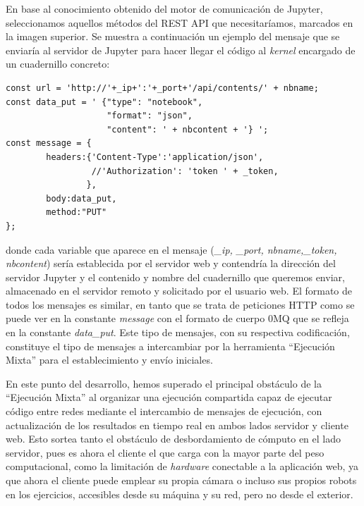 En base al conocimiento obtenido del motor de comunicación de Jupyter, seleccionamos aquellos métodos del REST API que necesitaríamos, marcados en la imagen superior. Se muestra a continuación un ejemplo del mensaje que se enviaría al servidor de Jupyter para hacer llegar el código al \textit{kernel} encargado de un cuadernillo concreto:

\begin{minipage}{\linewidth}
\begin{lstlisting}[caption=Formato de Mensajes de ``Ejecución Mixta'']
const url = 'http://'+_ip+':'+_port+'/api/contents/' + nbname;
const data_put = ' {"type": "notebook",
                    "format": "json",
                    "content": ' + nbcontent + '} ';
const message = {
        headers:{'Content-Type':'application/json',
                 //'Authorization': 'token ' + _token,
                },
        body:data_put,
        method:"PUT"
};
\end{lstlisting}
\end{minipage}

donde cada variable que aparece en el mensaje (\textit{\_ip, \_port, nbname,\_token, nbcontent}) sería establecida por el servidor web y contendría la dirección del servidor Jupyter y el contenido y nombre del cuadernillo que queremos enviar, almacenado en el servidor remoto y solicitado por el usuario web. El formato de todos los mensajes es similar, en tanto que se trata de peticiones HTTP como se puede ver en la constante \textit{message} con el formato de cuerpo 0MQ que se refleja en la constante \textit{data\_put}. Este tipo de mensajes, con su respectiva codificación, constituye el tipo de mensajes a intercambiar por la herramienta ``Ejecución Mixta'' para el establecimiento y envío iniciales.

En este punto del desarrollo, hemos superado el principal obstáculo de la ``Ejecución Mixta'' al organizar una ejecución compartida capaz de ejecutar código entre redes mediante el intercambio de mensajes de ejecución, con actualización de los resultados en tiempo real en ambos lados servidor  y cliente web. Esto sortea tanto el obstáculo de desbordamiento de cómputo en el lado servidor, pues es ahora el cliente el que carga con la mayor parte del peso computacional, como la limitación de \textit{hardware} conectable a la aplicación web, ya que ahora el cliente puede emplear su propia cámara o incluso sus propios robots en los ejercicios, accesibles desde su máquina y su red, pero no desde el exterior.

